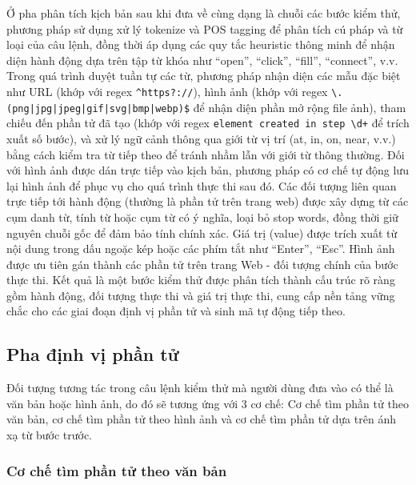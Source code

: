 \documentclass[a4paper, 12pt]{report}
\begin{document}
{Ở pha phân tích kịch bản sau khi đưa về cùng dạng là chuỗi các bước kiểm thử, phương pháp sử dụng xử lý tokenize và POS tagging để phân tích cú pháp và từ loại của câu lệnh, đồng thời áp dụng các quy tắc heuristic thông minh để nhận diện hành động dựa trên tập từ khóa như ``open'', ``click'', ``fill'', ``connect'', v.v. Trong quá trình duyệt tuần tự các từ, phương pháp nhận diện các mẫu đặc biệt như URL (khớp với regex \texttt{\textasciicircum https?://}), hình ảnh (khớp với regex \texttt{\textbackslash.(png|jpg|jpeg|gif|svg|bmp|webp)\$} để nhận diện phần mở rộng file ảnh), tham chiếu đến phần tử đã tạo (khớp với regex \texttt{element created in step \textbackslash d+} để trích xuất số bước), và xử lý ngữ cảnh thông qua giới từ vị trí (at, in, on, near, v.v.) bằng cách kiểm tra từ tiếp theo để tránh nhầm lẫn với giới từ thông thường. Đối với hình ảnh được dán trực tiếp vào kịch bản, phương pháp có cơ chế tự động lưu lại hình ảnh để phục vụ cho quá trình thực thi sau đó. Các đối tượng liên quan trực tiếp tới hành động (thường là phần tử trên trang web) được xây dựng từ các cụm danh từ, tính từ hoặc cụm từ có ý nghĩa, loại bỏ stop words, đồng thời giữ nguyên chuỗi gốc để đảm bảo tính chính xác. Giá trị (value) được trích xuất từ nội dung trong dấu ngoặc kép hoặc các phím tắt như ``Enter'', ``Esc''. Hình ảnh được ưu tiên gán thành các phần tử trên trang Web - đối tượng chính của bước thực thi. Kết quả là một bước kiểm thử được phân tích thành cấu trúc rõ ràng gồm hành động, đối tượng thực thi và giá trị thực thi, cung cấp nền tảng vững chắc cho các giai đoạn định vị phần tử và sinh mã tự động tiếp theo.


\subsection{Pha định vị phần tử}
Đối tượng tương tác trong câu lệnh kiểm thử mà người dùng đưa vào có thể là văn bản hoặc hình ảnh, do đó sẽ tương ứng với 3 cơ chế: Cơ chế tìm phần tử theo văn bản, cơ chế tìm phần tử theo hình ảnh và cơ chế tìm phần tử dựa trên ánh xạ từ bước trước.

\subsubsection{Cơ chế tìm phần tử theo văn bản}

}
\end{document}
